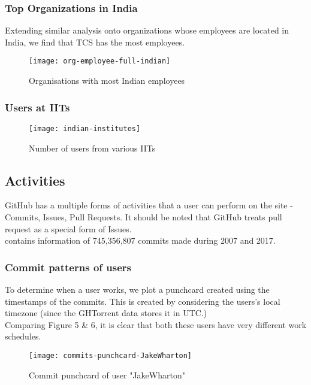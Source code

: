 \newpage

\subsubsection{Top Organizations in India}

Extending similar analysis onto organizations whose employees are located in India, we find that
TCS has the most employees.

\begin{figure}[htb]
\centering
\centerline{\texttt{[image: org-employee-full-indian]}}
\caption{Organisations with most Indian employees}
\end{figure}

\newpage
\subsubsection{Users at IITs}

\begin{figure}[htb]
\centering
\texttt{[image: indian-institutes]}
\caption{Number of users from various IITs}
\end{figure}

\newpage
\subsection{Activities}

GitHub has a multiple forms of activities that a user can perform on the site - Commits, Issues, Pull Requests.
It should be noted that GitHub treats pull request as a special form of Issues. \\

 contains information of 745,356,807 commits made during 2007 and 2017.

\subsubsection{Commit patterns of users}

To determine when a user works, we plot a punchcard created using the timestamps of the commits.
This is created by considering the users's local timezone (since the GHTorrent data stores it in UTC.) \\

Comparing Figure 5 \& 6, it is clear that both these users have very different work schedules.

\begin{figure}[htb]
\centering
\texttt{[image: commits-punchcard-JakeWharton]}
\caption{Commit punchcard of user "JakeWharton"}
\end{figure}

